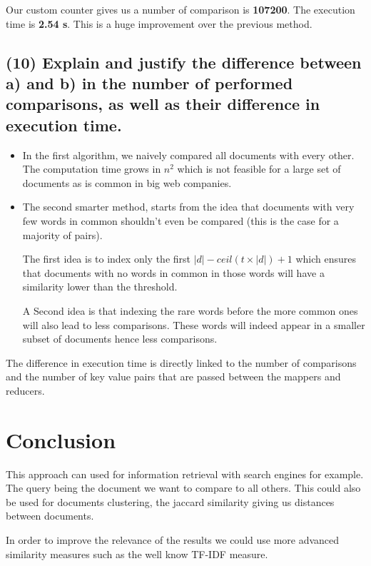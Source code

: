 \documentclass[a4paper,10pt]{article}
\begin{document}
Our custom counter gives us a number of comparison is \textbf{107200}.
The execution time is \textbf{2.54 s}.
This is a huge improvement over the previous method.


\subsection{(10) Explain and justify the difference between a) and b) in the number of performed
comparisons, as well as their difference in execution time.}
\begin{itemize}
\item
In the first algorithm, we naively compared all documents with every other.
The computation time grows in $n^2$ which is not feasible for a large set of
documents as is common in big web companies.

\item
The second smarter method, starts from the idea that documents with very few
words in common shouldn't even be compared (this is the case for a majority of pairs).

The first idea is to index only the first  $|d| - ceil(t \times |d|) + 1$ which
ensures that documents with no words in common in those words will have a similarity
lower than the threshold.

A Second idea is that indexing the rare words before the more common ones will
also lead to less comparisons. These words will indeed appear in a smaller
subset of documents hence less comparisons.

\end{itemize}

The difference in execution time is directly linked to the number of comparisons
and the number of key value pairs that are passed between the mappers and reducers.


\section{Conclusion}
This approach can used for information retrieval with search engines for example.
The query being the document we want to compare to all others.
This could also be used for documents clustering, the jaccard similarity giving
us distances between documents.

In order to improve the relevance of the results we could use more advanced
similarity measures such as the well know TF-IDF measure.
\end{document}
